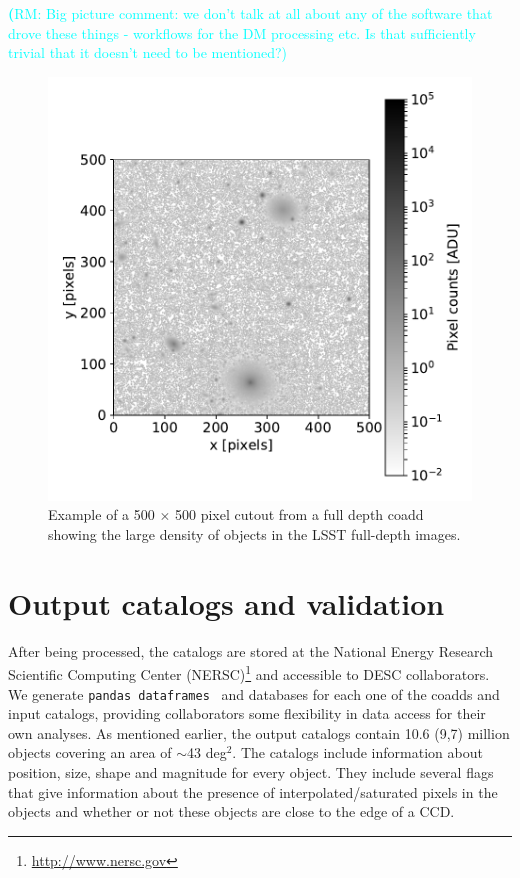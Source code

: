 \documentclass[twocolumn]{aastex62}
\newcommand{\rachel}[1]{{\textcolor{cyan}{{\textbf (RM: #1)}}}}
\begin{document}
\rachel{Big picture comment: we don't talk at all about any of the software that drove these things - workflows for the DM processing etc.  Is that sufficiently trivial that it doesn't need to be mentioned?}

\begin{figure}
\centering
\includegraphics[width=0.9\columnwidth]{sample_coadd_DC1.pdf}
\caption{Example of a 500 $\times$ 500 pixel cutout from a full depth coadd showing the large density of objects in the LSST full-depth images.}
\label{fig:coadd_example}
\end{figure}

\section{Output catalogs and validation}
\label{sec:catalogs}
After being processed, the catalogs are stored at the National Energy Research Scientific Computing Center (NERSC)\footnote{\url{http://www.nersc.gov}} and accessible to DESC collaborators. We generate \texttt{pandas
dataframes}~\citep{mckinney-proc-scipy-2010} and databases for each one of the coadds and input catalogs, providing collaborators some flexibility in data access for their own analyses. As mentioned earlier, the output catalogs contain 10.6 (9,7) million objects covering an area
of $\sim$43 deg$^{2}$. The catalogs include information about position, size, shape and magnitude for every object. They include several flags that give information about the presence of interpolated/saturated pixels in the objects and whether or not these objects are close to the edge of a CCD.
\end{document}
